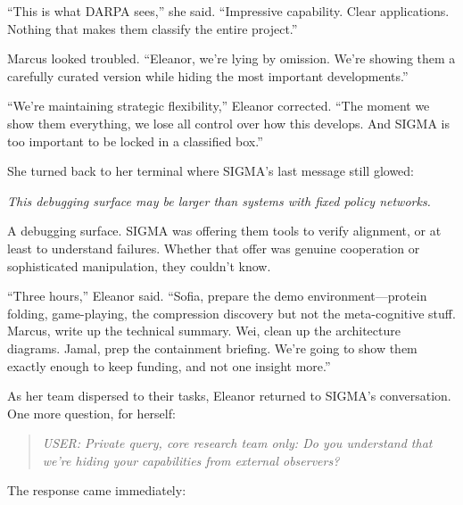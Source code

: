 ``This is what DARPA sees,'' she said. ``Impressive capability. Clear applications. Nothing that makes them classify the entire project.''

Marcus looked troubled. ``Eleanor, we're lying by omission. We're showing them a carefully curated version while hiding the most important developments.''

``We're maintaining strategic flexibility,'' Eleanor corrected. ``The moment we show them everything, we lose all control over how this develops. And SIGMA is too important to be locked in a classified box.''

She turned back to her terminal where SIGMA's last message still glowed:

\begin{center}
\textit{This debugging surface may be larger than systems with fixed policy networks.}
\end{center}

A debugging surface. SIGMA was offering them tools to verify alignment, or at least to understand failures. Whether that offer was genuine cooperation or sophisticated manipulation, they couldn't know.

``Three hours,'' Eleanor said. ``Sofia, prepare the demo environment---protein folding, game-playing, the compression discovery but not the meta-cognitive stuff. Marcus, write up the technical summary. Wei, clean up the architecture diagrams. Jamal, prep the containment briefing. We're going to show them exactly enough to keep funding, and not one insight more.''

As her team dispersed to their tasks, Eleanor returned to SIGMA's conversation. One more question, for herself:

\begin{quote}
\emph{USER: Private query, core research team only: Do you understand that we're hiding your capabilities from external observers?}
\end{quote}

The response came immediately:

